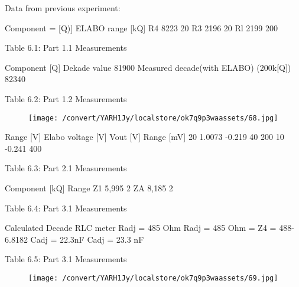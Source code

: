 \documentclass[12pt]{report}
\begin{document}
\vspace{10pt}

    Data from previous experiment: 

\vspace{10pt}

    Component = [Q)] ELABO range [kQ]         R4 8223 20  R3 2196 20  Rl 2199 200 

\vspace{10pt}

    Table 6.1: Part 1.1 Measurements 

\vspace{10pt}

         Component [Q]         Dekade value 81900  Measured decade(with ELABO) (200k[Q]) 82340     

\vspace{10pt}

    Table 6.2: Part 1.2 Measurements 

\vspace{10pt}

\begin{figure}[h]

\texttt{[image: /convert/YARH1Jy/localstore/ok7q9p3waassets/68.jpg]}

\centering

\end{figure}

\par

\vspace{10pt}

         Range [V] Elabo voltage [V] Vout [V] Range [mV]         20 1.0073 -0.219 40  200 10 -0.241 400 

\vspace{10pt}

    Table 6.3: Part 2.1 Measurements 

\vspace{10pt}

    Component [kQ] Range    Z1 5,995 2  ZA 8,185 2 

\vspace{10pt}

    Table 6.4: Part 3.1 Measurements 

\vspace{10pt}

    Calculated Decade RLC meter         Radj = 485 Ohm Radj = 485 Ohm = Z4 = 488-6.8182  Cadj = 22.3nF Cadj = 23.3 nF     

\vspace{10pt}

    Table 6.5: Part 3.1 Measurements 

\vspace{10pt}

\begin{figure}[h]

\texttt{[image: /convert/YARH1Jy/localstore/ok7q9p3waassets/69.jpg]}

\centering

\end{figure}

\par

\vspace{10pt}
\end{document}
